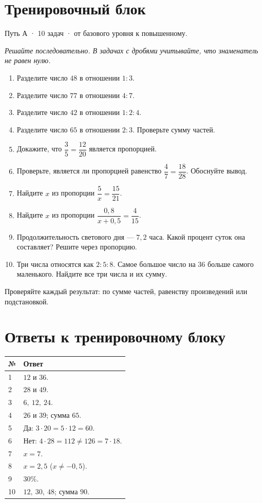 \documentclass[a4paper,12pt]{article}
\begin{document}
\section*{Тренировочный блок}
\textcolor{muted}{Путь А · 10 задач · от базового уровня к повышенному.}\par
\textit{Решайте последовательно. В задачах с дробями учитывайте, что знаменатель не равен нулю.}
\begin{enumerate}
\item Разделите число \(48\) в отношении \(1:3\).
\item Разделите число \(77\) в отношении \(4:7\).
\item Разделите число \(42\) в отношении \(1:2:4\).
\item Разделите число \(65\) в отношении \(2:3\). Проверьте сумму частей.
\item Докажите, что \(\dfrac35=\dfrac{12}{20}\) является пропорцией.
\item Проверьте, является ли пропорцией равенство \(\dfrac47=\dfrac{18}{28}\). Обоснуйте вывод.
\item Найдите \(x\) из пропорции \(\dfrac5x=\dfrac{15}{21}\).
\item Найдите \(x\) из пропорции \(\dfrac{0{,}8}{x+0{,}5}=\dfrac4{15}\).
\item Продолжительность светового дня --- \(7{,}2\) часа. Какой процент суток она составляет? Решите через пропорцию.
\item Три числа относятся как \(2:5:8\). Самое большое число на \(36\) больше самого маленького. Найдите все три числа и их сумму.
\end{enumerate}
\vfill
\begin{center}
\small\textcolor{muted}{Проверяйте каждый результат: по сумме частей, равенству произведений или подстановкой.}
\end{center}

\clearpage
\section*{Ответы к тренировочному блоку}
\begin{center}
\renewcommand{\arraystretch}{1.55}
\begin{tabularx}{\linewidth}{@{}p{15mm}X@{}}
\toprule
\textbf{№}&\textbf{Ответ}\tabularnewline
\midrule
1 & \(12\) и \(36\).\\
2 & \(28\) и \(49\).\\
3 & \(6,\ 12,\ 24\).\\
4 & \(26\) и \(39\); сумма \(65\).\\
5 & Да: \(3\cdot20=5\cdot12=60\).\\
6 & Нет: \(4\cdot28=112\ne126=7\cdot18\).\\
7 & \(x=7\).\\
8 & \(x=2{,}5\) (\(x\ne-0{,}5\)).\\
9 & \(30\%\).\\
10 & \(12,\ 30,\ 48\); сумма \(90\).\\
\bottomrule
\end{tabularx}
\end{center}
\vspace{12mm}
\end{document}
